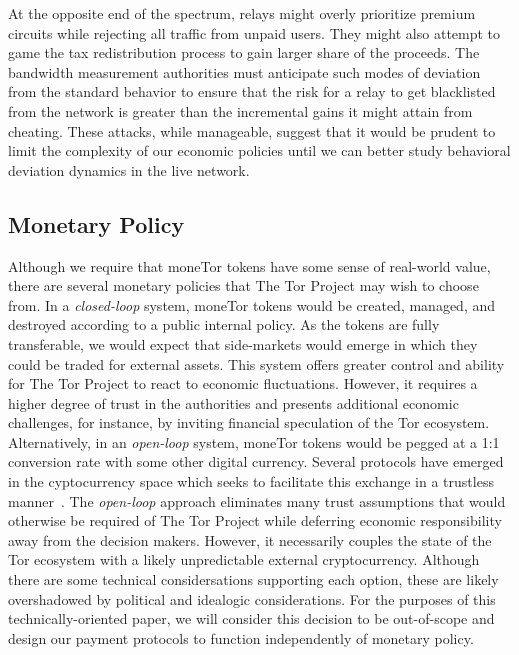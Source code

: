 At the opposite end of the spectrum, relays might overly prioritize premium
circuits while rejecting all traffic from unpaid users. They might also attempt
to game the tax redistribution process to gain larger share of the proceeds. The
bandwidth measurement authorities must anticipate such modes of deviation from
the standard behavior to ensure that the risk for a relay to get blacklisted
from the network is greater than the incremental gains it might attain from
cheating. These attacks, while manageable, suggest that it would be prudent to
limit the complexity of our economic policies until we can better study
behavioral deviation dynamics in the live network.


\subsection{Monetary Policy}

Although we require that moneTor tokens have some sense of real-world value,
there are several monetary policies that The Tor Project may wish to choose
from. In a \emph{closed-loop} system, moneTor tokens would be created, managed,
and destroyed according to a public internal policy. As the tokens are fully
transferable, we would expect that side-markets would emerge in which they could
be traded for external assets. This system offers greater control and ability
for The Tor Project to react to economic fluctuations. However, it requires a
higher degree of trust in the authorities and presents additional economic
challenges, for instance, by inviting financial speculation of the Tor
ecosystem. Alternatively, in an \emph{open-loop} system, moneTor tokens would be
pegged at a 1:1 conversion rate with some other digital currency. Several
protocols have emerged in the cyptocurrency space which seeks to facilitate this
exchange in a trustless manner~\cite{back2014enabling, poon2017plasma}. The
\emph{open-loop} approach eliminates many trust assumptions that would otherwise
be required of The Tor Project while deferring economic responsibility away from
the decision makers. However, it necessarily couples the state of the Tor
ecosystem with a likely unpredictable external cryptocurrency. Although there
are some technical considersations supporting each option, these are likely
overshadowed by political and idealogic considerations. For the purposes of this
technically-oriented paper, we will consider this decision to be out-of-scope
and design our payment protocols to function independently of monetary policy.

